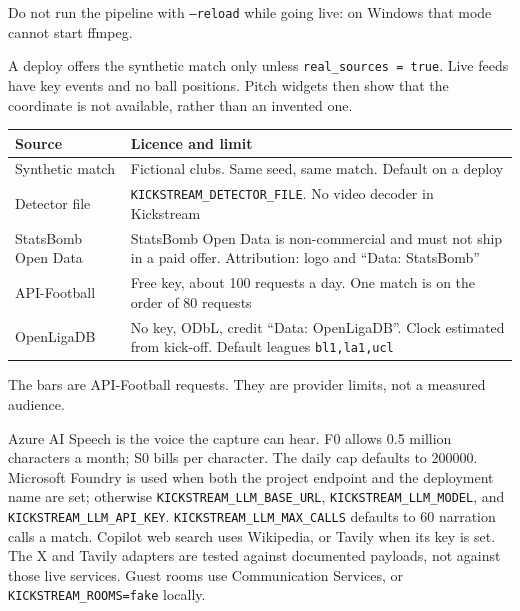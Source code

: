 \documentclass[11pt]{article}
\begin{document}
Do not run the pipeline with \texttt{--reload} while going live: on Windows that
mode cannot start ffmpeg.

A deploy offers the synthetic match only unless \texttt{real\_sources = true}.
Live feeds have key events and no ball positions.
Pitch widgets then show that the coordinate is not available, rather than an invented one.

\begin{tabularx}{\textwidth}{@{}lX@{}}
\toprule
Source & Licence and limit \\
\midrule
Synthetic match & Fictional clubs. Same seed, same match. Default on a deploy \\
Detector file & \texttt{KICKSTREAM\_DETECTOR\_FILE}. No video decoder in Kickstream \\
StatsBomb Open Data & StatsBomb Open Data is non-commercial and must not ship in a paid offer. Attribution: logo and ``Data: StatsBomb'' \\
API-Football & Free key, about 100 requests a day. One match is on the order of 80 requests \\
OpenLigaDB & No key, ODbL, credit ``Data: OpenLigaDB''. Clock estimated from kick-off. Default leagues \texttt{bl1,la1,ucl} \\
\bottomrule
\end{tabularx}

The bars are API-Football requests. They are provider limits, not a measured audience.

\begin{center}
\end{center}

Azure AI Speech is the voice the capture can hear.
F0 allows 0.5 million characters a month; S0 bills per character.
The daily cap defaults to 200000.
Microsoft Foundry is used when both the project endpoint and the deployment name
are set; otherwise \texttt{KICKSTREAM\_LLM\_BASE\_URL}, \texttt{KICKSTREAM\_LLM\_MODEL},
and \texttt{KICKSTREAM\_LLM\_API\_KEY}.
\texttt{KICKSTREAM\_LLM\_MAX\_CALLS} defaults to 60 narration calls a match.
Copilot web search uses Wikipedia, or Tavily when its key is set.
The X and Tavily adapters are tested against documented payloads, not against
those live services.
Guest rooms use Communication Services, or \texttt{KICKSTREAM\_ROOMS=fake} locally.
\end{document}
